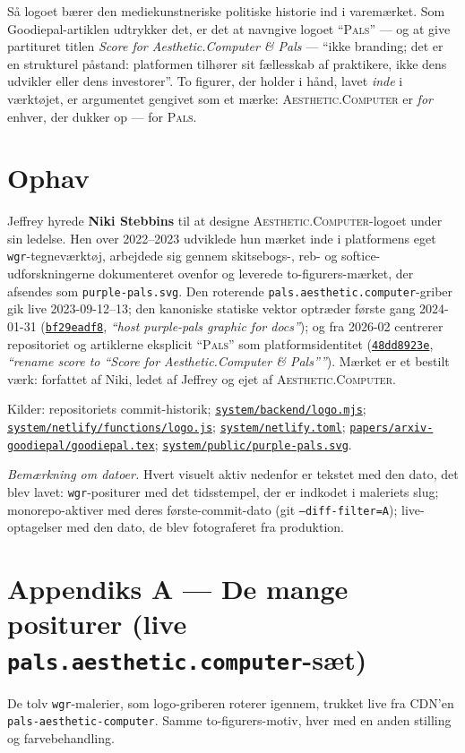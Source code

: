 \documentclass[10pt,letterpaper,twocolumn]{article}
\newcommand{\ac}{\textsc{Aesthetic}{\color{acpink}.}\textsc{Computer}}
\newcommand{\pals}{\textsc{Pals}}
\newcommand{\commit}[2]{\href{https://github.com/whistlegraph/aesthetic-computer/commit/#1}{\texttt{#1}}, \emph{``#2''}}
\newcommand{\repofile}[1]{\href{https://github.com/whistlegraph/aesthetic-computer/blob/main/#1}{\texttt{#1}}}
\begin{document}
Så logoet bærer den mediekunstneriske politiske historie ind i varemærket.
Som Goodiepal-artiklen udtrykker det, er det at navngive logoet
``\pals{}'' --- og at give partituret titlen \emph{Score for
Aesthetic{\color{acpink}.}Computer \& Pals} --- ``ikke branding; det er en
strukturel påstand: platformen tilhører sit fællesskab af praktikere, ikke
dens udvikler eller dens investorer''. To figurer, der holder i hånd, lavet
\emph{inde} i værktøjet, er argumentet gengivet som et mærke: \ac{} er
\emph{for} enhver, der dukker op --- for \pals{}.

\section{Ophav}

Jeffrey hyrede \textbf{Niki Stebbins} til at designe \ac{}-logoet under sin
ledelse. Hen over 2022--2023 udviklede hun mærket inde i platformens eget
\texttt{wgr}-tegneværktøj, arbejdede sig gennem skitsebogs-, reb- og
softice-udforskningerne dokumenteret ovenfor og leverede to-figurers-mærket,
der afsendes som \texttt{purple-pals.svg}. Den roterende
\texttt{pals.aesthetic.computer}-griber gik live 2023-09-12--13; den
kanoniske statiske vektor optræder første gang 2024-01-31
(\commit{bf29eadf8}{host purple-pals graphic for docs}); og fra 2026-02
centrerer repositoriet og artiklerne eksplicit ``\pals{}'' som
platformsidentitet (\commit{48dd8923e}{rename score to ``Score for
Aesthetic.Computer \& Pals''}). Mærket er et bestilt værk: forfattet af
Niki, ledet af Jeffrey og ejet af \ac{}.

\vspace{0.6em}
{\footnotesize\color{acgray}\noindent Kilder: repositoriets commit-historik;
\repofile{system/backend/logo.mjs};
\repofile{system/netlify/functions/logo.js};
\repofile{system/netlify.toml};
\repofile{papers/arxiv-goodiepal/goodiepal.tex};
\repofile{system/public/purple-pals.svg}.\par}

\onecolumn
\appendix

\noindent\emph{Bemærkning om datoer.} Hvert visuelt aktiv nedenfor er
tekstet med den dato, det blev lavet: \texttt{wgr}-positurer med det
tidsstempel, der er indkodet i maleriets slug; monorepo-aktiver med deres
første-commit-dato (git \texttt{--diff-filter=A}); live-optagelser med den
dato, de blev fotograferet fra produktion.

\section*{Appendiks A --- De mange positurer (live \texttt{pals.aesthetic.computer}-sæt)}
\noindent De tolv \texttt{wgr}-malerier, som logo-griberen roterer igennem,
trukket live fra CDN'en \texttt{pals-aesthetic-computer}. Samme
to-figurers-motiv, hver med en anden stilling og farvebehandling.
\vspace{1.2em}
\end{document}
